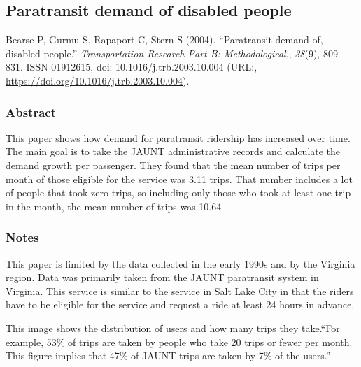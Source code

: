 \documentclass[
]{article}
\begin{document}
\hypertarget{paratransit-demand-of-disabled-people}{%
\subsection{Paratransit demand of disabled
people}\label{paratransit-demand-of-disabled-people}}

Bearse P, Gurmu S, Rapaport C, Stern S (2004). ``Paratransit demand of,
disabled people.'' \emph{Transportation Research Part B:
Methodological},, \emph{38}(9), 809-831. ISSN 01912615, doi:
10.1016/j.trb.2003.10.004 (URL:,
\url{https://doi.org/10.1016/j.trb.2003.10.004}).

\hypertarget{abstract-29}{%
\subsubsection{Abstract}\label{abstract-29}}

This paper shows how demand for paratransit ridership has increased over
time. The main goal is to take the JAUNT administrative records and
calculate the demand growth per passenger. They found that the mean
number of trips per month of those eligible for the service was 3.11
trips. That number includes a lot of people that took zero trips, so
including only those who took at least one trip in the month, the mean
number of trips was 10.64

\hypertarget{notes-29}{%
\subsubsection{Notes}\label{notes-29}}

This paper is limited by the data collected in the early 1990s and by
the Virginia region. Data was primarily taken from the JAUNT paratransit
system in Virginia. This service is similar to the service in Salt Lake
City in that the riders have to be eligible for the service and request
a ride at least 24 hours in advance.

This image shows the distribution of users and how many trips they
take.``For example, 53\% of trips are taken by people who take 20 trips
or fewer per month. This figure implies that 47\% of JAUNT trips are
taken by 7\% of the users.''
\end{document}
